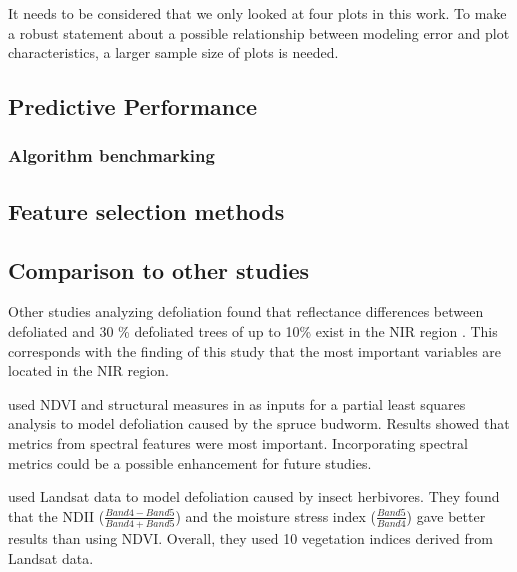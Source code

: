 \documentclass[review]{elsarticle}
\begin{document}
It needs to be considered that we only looked at four plots in this work.
To make a robust statement about a possible relationship between modeling error and plot characteristics, a larger sample size of plots is needed.

\subsection{Predictive Performance}

\subsubsection{Algorithm benchmarking}

\subsection{Feature selection methods}

\subsection{Comparison to other studies}

\noindent Other studies analyzing defoliation found that reflectance differences between defoliated and 30 \% defoliated trees of up to 10\% exist in the \ac{NIR} region \citep{rengara2016}.
This corresponds with the finding of this study that the most important variables are located in the NIR region.

\cite{goodbody2018} used NDVI and structural measures in as inputs for a partial least squares analysis to model defoliation caused by the spruce budworm.
Results showed that metrics from spectral features were most important.
Incorporating spectral metrics could be a possible enhancement for future studies.

\cite{townsend2012} used Landsat data to model defoliation caused by insect herbivores.
They found that the \ac{NDII} ($\frac{Band 4 - Band 5}{Band 4 + Band 5}$) and the moisture stress index ($\frac{Band 5}{Band 4}$) gave better results than using NDVI.
Overall, they used 10 vegetation indices derived from Landsat data.

\end{document}
